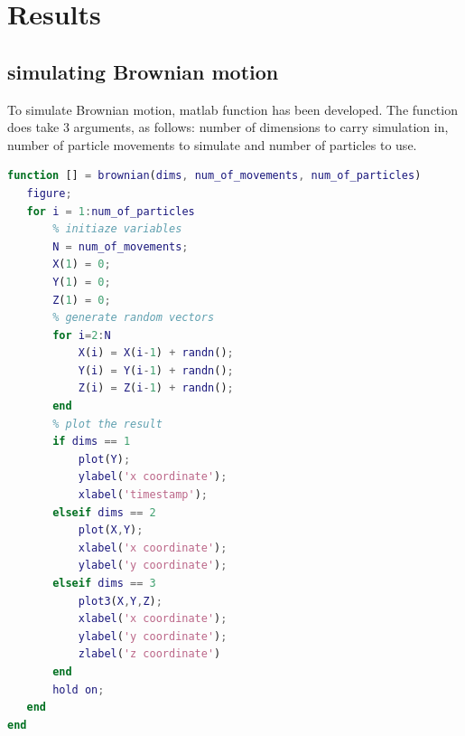 \documentclass[onecolumn]{article}
\begin{document}
\section{Results}
\subsection{simulating Brownian motion}
To simulate Brownian motion, matlab function has been developed. The function does take 3 arguments, as follows: number of dimensions to carry simulation in, number of particle movements to simulate and number of particles to use.

\vspace{1em}

\begin{lstlisting}[language=Matlab,frame=single,breaklines=true,caption={Function that simulates Brownian motion}]
function [] = brownian(dims, num_of_movements, num_of_particles)
   figure;
   for i = 1:num_of_particles
       % initiaze variables
       N = num_of_movements;
       X(1) = 0;
       Y(1) = 0;
       Z(1) = 0;
       % generate random vectors
       for i=2:N
           X(i) = X(i-1) + randn();
           Y(i) = Y(i-1) + randn();
           Z(i) = Z(i-1) + randn();
       end
       % plot the result
       if dims == 1
           plot(Y);
           ylabel('x coordinate');
           xlabel('timestamp');
       elseif dims == 2
           plot(X,Y);
           xlabel('x coordinate');
           ylabel('y coordinate');
       elseif dims == 3
           plot3(X,Y,Z);
           xlabel('x coordinate');
           ylabel('y coordinate');
           zlabel('z coordinate')
       end
       hold on;
   end
end
\end{lstlisting}
\end{document}
